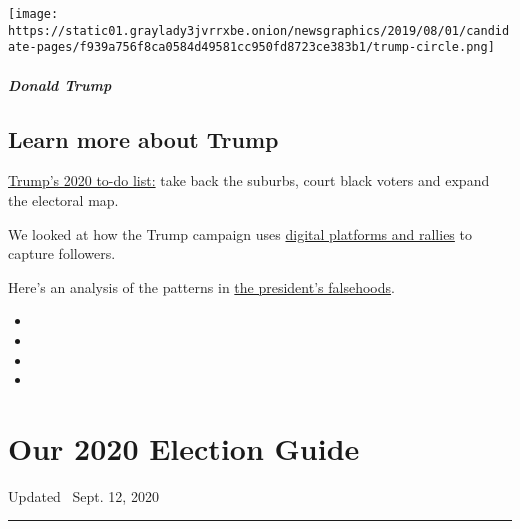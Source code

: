 \texttt{[image: https://static01.graylady3jvrrxbe.onion/newsgraphics/2019/08/01/candidate-pages/f939a756f8ca0584d49581cc950fd8723ce383b1/trump-circle.png]}

\hypertarget{donald-trump-1}{%
\subparagraph{Donald Trump}\label{donald-trump-1}}

\hypertarget{learn-more-about-trump}{%
\subsection{Learn more about Trump}\label{learn-more-about-trump}}

\href{https://www.nytimes3xbfgragh.onion/2020/02/08/us/politics/trump-reelection-campaign.html}{Trump's
2020 to-do list:} take back the suburbs, court black voters and expand
the electoral map.

We looked at how the Trump campaign uses
\href{https://www.nytimes3xbfgragh.onion/2020/02/27/us/politics/trump-rally-campaign-data.html}{digital
platforms and rallies} to capture followers.

Here's an analysis of the patterns in
\href{https://www.nytimes3xbfgragh.onion/2018/12/29/us/politics/trump-fact-check.html}{the
president's falsehoods}.

\begin{itemize}
\item
\item
\item
\item
\end{itemize}

\hypertarget{our-2020-election-guide}{%
\section{Our 2020 Election Guide}\label{our-2020-election-guide}}

Updated ~Sept. 12, 2020

\begin{center}\rule{0.5\linewidth}{\linethickness}\end{center}


